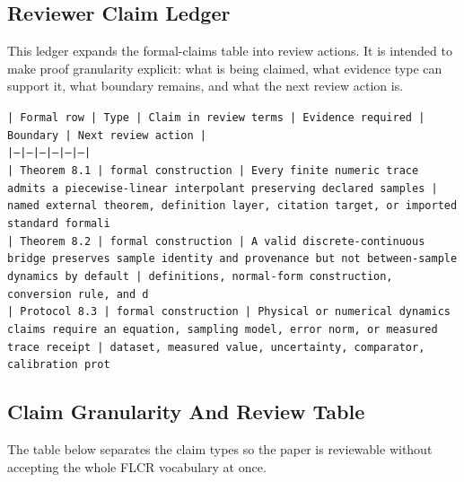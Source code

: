 \documentclass[11pt]{article}
\begin{document}
\subsection*{Reviewer Claim Ledger}

This ledger expands the formal-claims table into review actions. It is intended to make proof granularity explicit: what is being claimed, what evidence type can support it, what boundary remains, and what the next review action is.

\noindent\texttt{| Formal row | Type | Claim in review terms | Evidence required | Boundary | Next review action |}\\
\noindent\texttt{|---|---|---|---|---|---|}\\
\noindent\texttt{| Theorem 8.1 | formal construction | Every finite numeric trace admits a piecewise-linear interpolant preserving declared samples | named external theorem, definition layer, citation target, or imported standard formali}\\
\noindent\texttt{| Theorem 8.2 | formal construction | A valid discrete-continuous bridge preserves sample identity and provenance but not between-sample dynamics by default | definitions, normal-form construction, conversion rule, and d}\\
\noindent\texttt{| Protocol 8.3 | formal construction | Physical or numerical dynamics claims require an equation, sampling model, error norm, or measured trace receipt | dataset, measured value, uncertainty, comparator, calibration prot}\\

\subsection*{Claim Granularity And Review Table}

The table below separates the claim types so the paper is reviewable without accepting the whole FLCR vocabulary at once.
\end{document}
